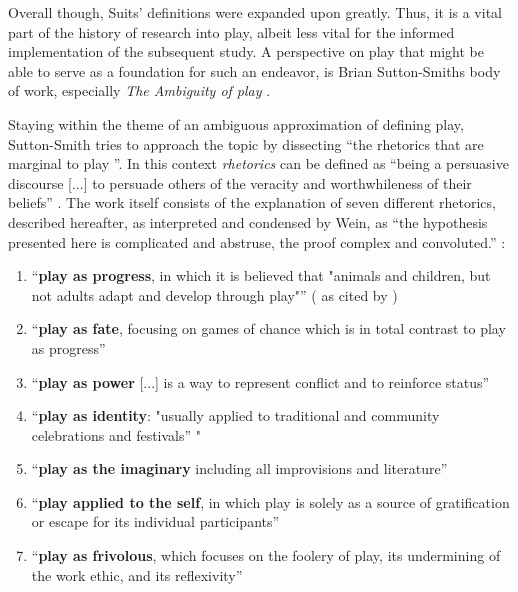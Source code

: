 Overall though, Suits' definitions were expanded upon greatly. Thus, it is a vital part of the history of research into play, albeit less vital for the informed implementation of the subsequent study. A perspective on play that might be able to serve as a foundation for such an endeavor, is Brian Sutton-Smiths body of work, especially \textit{The Ambiguity of play} \cite{sutton2009ambiguity}.

Staying within the theme of an ambiguous approximation of defining play, Sutton-Smith tries to approach the topic by dissecting \enquote{the rhetorics that are marginal to play \cite[p. VII]{sutton2009ambiguity}}. In this context \textit{rhetorics} can be defined as \enquote{being a persuasive discourse [...] to persuade others of the veracity and worthwhileness of their beliefs} \cite[p. 213]{wein2000suttonreview}. The work itself consists of the explanation of seven different rhetorics, described hereafter, as interpreted and condensed by Wein, as \enquote{the hypothesis presented here is complicated and abstruse, the proof complex and convoluted.} \cite{wein2000suttonreview}:

\begin{enumerate}
  \item{\enquote{\textbf{play as progress}, in which it is believed that "animals and children, but not adults adapt and develop through play"} (\cite[p. 8]{sutton2009ambiguity} as cited by \cite[p. 213]{wein2000suttonreview})}
  \item{\enquote{\textbf{play as fate}, focusing on games of chance which is in total contrast to play as progress} \cite[p. 213]{wein2000suttonreview}}
  \item{\enquote{\textbf{play as power} [...] is a way to represent conflict and to reinforce status} \cite[p. 213]{wein2000suttonreview}}
  \item{\enquote{\textbf{play as identity}: "usually applied to traditional and community celebrations and festivals} \cite[p. 10]{sutton2009ambiguity}" \cite[p. 213]{wein2000suttonreview}}
  \item{\enquote{\textbf{play as the imaginary} including all improvisions and literature} \cite[p. 213]{wein2000suttonreview}}
  \item{\enquote{\textbf{play applied to the self}, in which play is solely as a source of gratification or escape for its individual participants} \cite[p. 213]{wein2000suttonreview}}
  \item{\enquote{\textbf{play as frivolous}, which focuses on the foolery of play, its undermining of the work ethic, and its reflexivity} \cite[p. 213]{wein2000suttonreview}}
\end{enumerate}

